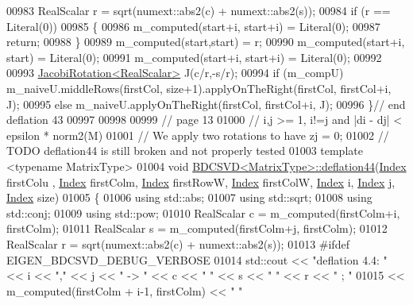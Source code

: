 \begin{DoxyCode}
00983   RealScalar r = sqrt(numext::abs2(c) + numext::abs2(s));
00984   \textcolor{keywordflow}{if} (r == Literal(0))
00985   \{
00986     m\_computed(start+i, start+i) = Literal(0);
00987     \textcolor{keywordflow}{return};
00988   \}
00989   m\_computed(start,start) = r;  
00990   m\_computed(start+i, start) = Literal(0);
00991   m\_computed(start+i, start+i) = Literal(0);
00992   
00993   \hyperlink{group___jacobi___module_class_eigen_1_1_jacobi_rotation}{JacobiRotation<RealScalar>} J(c/r,-s/r);
00994   \textcolor{keywordflow}{if} (m\_compU)  m\_naiveU.middleRows(firstCol, size+1).applyOnTheRight(firstCol, firstCol+i, J);
00995   \textcolor{keywordflow}{else}          m\_naiveU.applyOnTheRight(firstCol, firstCol+i, J);
00996 \}\textcolor{comment}{// end deflation 43}
00997 
00998 
00999 \textcolor{comment}{// page 13}
01000 \textcolor{comment}{// i,j >= 1, i!=j and |di - dj| < epsilon * norm2(M)}
01001 \textcolor{comment}{// We apply two rotations to have zj = 0;}
01002 \textcolor{comment}{// TODO deflation44 is still broken and not properly tested}
01003 \textcolor{keyword}{template} <\textcolor{keyword}{typename} MatrixType>
01004 \textcolor{keywordtype}{void} \hyperlink{group___s_v_d___module_class_eigen_1_1_b_d_c_s_v_d}{BDCSVD<MatrixType>::deflation44}(\hyperlink{namespace_eigen_a62e77e0933482dafde8fe197d9a2cfde}{Index} firstColu , 
      \hyperlink{namespace_eigen_a62e77e0933482dafde8fe197d9a2cfde}{Index} firstColm, \hyperlink{namespace_eigen_a62e77e0933482dafde8fe197d9a2cfde}{Index} firstRowW, \hyperlink{namespace_eigen_a62e77e0933482dafde8fe197d9a2cfde}{Index} firstColW, \hyperlink{namespace_eigen_a62e77e0933482dafde8fe197d9a2cfde}{Index} i, 
      \hyperlink{namespace_eigen_a62e77e0933482dafde8fe197d9a2cfde}{Index} j, \hyperlink{namespace_eigen_a62e77e0933482dafde8fe197d9a2cfde}{Index} size)
01005 \{
01006   \textcolor{keyword}{using} std::abs;
01007   \textcolor{keyword}{using} std::sqrt;
01008   \textcolor{keyword}{using} std::conj;
01009   \textcolor{keyword}{using} std::pow;
01010   RealScalar c = m\_computed(firstColm+i, firstColm);
01011   RealScalar s = m\_computed(firstColm+j, firstColm);
01012   RealScalar r = sqrt(numext::abs2(c) + numext::abs2(s));
01013 \textcolor{preprocessor}{#ifdef  EIGEN\_BDCSVD\_DEBUG\_VERBOSE}
01014   std::cout << \textcolor{stringliteral}{"deflation 4.4: "} << i << \textcolor{stringliteral}{","} << j << \textcolor{stringliteral}{" -> "} << c << \textcolor{stringliteral}{" "} << s << \textcolor{stringliteral}{" "} << r << \textcolor{stringliteral}{" ; "}
01015     << m\_computed(firstColm + i-1, firstColm)  << \textcolor{stringliteral}{" "}

\end{DoxyCode}
